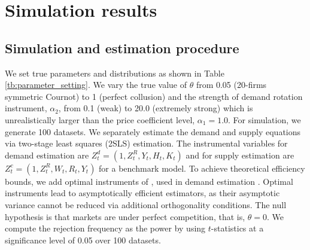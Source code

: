 \documentclass[11pt, a4paper]{article}
\begin{document}


\section{Simulation results}\label{sec:results}

\subsection{Simulation and estimation procedure}

We set true parameters and distributions as shown in Table \ref{tb:parameter_setting}. 
We vary the true value of $\theta$ from 0.05 (20-firms symmetric Cournot) to 1 (perfect collusion) and the strength of demand rotation instrument, $\alpha_2$, from 0.1 (weak) to 20.0 (extremely strong) which is unrealistically larger than the price coefficient level, $\alpha_1=1.0$.
For simulation, we generate 100 datasets.
We separately estimate the demand and supply equations via two-stage least squares (2SLS) estimation.
The instrumental variables for demand estimation are $Z^{d}_{t} = (1, Z^{R}_{t}, Y_{t}, H_{t}, K_{t})$ and for supply estimation are $Z^{c}_{t} = (1, Z^{R}_{t}, W_{t}, R_{t}, Y_{t})$ for a benchmark model. 
To achieve theoretical efficiency bounds, we add optimal instruments of \cite{chamberlain1987asymptotic}, used in demand estimation \citep{reynaert2014improving}. 
Optimal instruments lead to asymptotically efficient estimators, as their asymptotic variance cannot be reduced via additional orthogonality conditions.
The null hypothesis is that markets are under perfect competition, that is, $\theta=0$.
We compute the rejection
frequency as the power by using $t$-statistics at a significance level of 0.05 over 100 datasets.
\end{document}
